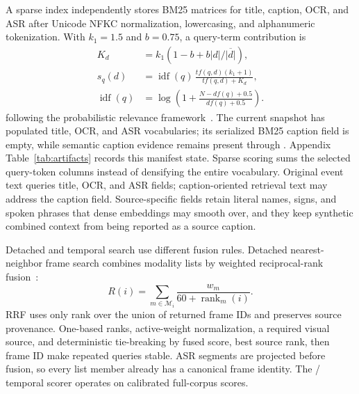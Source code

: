 A sparse index independently stores BM25 matrices for title, caption, OCR, and
ASR after Unicode NFKC normalization, lowercasing, and alphanumeric tokenization.
With $k_1=1.5$ and $b=0.75$, a query-term contribution is
\begin{equation}
 \begin{aligned}
  K_d&=k_1\!\left(1-b+b|d|/\overline{|d|}\right),\\
  s_q(d)&=\operatorname{idf}(q)\,
    \frac{tf(q,d)(k_1+1)}{tf(q,d)+K_d},\\
  \operatorname{idf}(q)&=\log\!\left(1+
    \frac{N-df(q)+0.5}{df(q)+0.5}\right).
 \end{aligned}
 \label{eq:bm25}
\end{equation}
following the probabilistic relevance framework~\cite{bm25}. The current snapshot
has populated title, OCR, and ASR vocabularies; its serialized BM25 caption field
is empty, while semantic caption evidence remains present through
\FrameContext{}. Appendix Table~\ref{tab:artifacts} records this manifest state.
Sparse scoring sums the selected query-token columns instead of densifying the
entire vocabulary. Original event text queries title, OCR, and ASR fields;
caption-oriented retrieval text may address the caption field. Source-specific
fields retain literal names, signs, and spoken phrases that dense embeddings may
smooth over, and they keep synthetic combined context from being reported as a
source caption.

Detached and temporal search use different fusion rules. Detached
nearest-neighbor frame search combines modality lists by weighted reciprocal-rank
fusion~\cite{rrf}:
\begin{equation}
 R(i)=\sum_{m\in\mathcal{M}_i}\frac{w_m}{60+\operatorname{rank}_m(i)}.
 \label{eq:rrf}
\end{equation}
RRF uses only rank over the union of returned frame IDs and preserves source
provenance. One-based ranks, active-weight normalization, a required visual
source, and deterministic tie-breaking by fused score, best source rank, then
frame ID make repeated queries stable. ASR segments are projected before fusion,
so every list member already has a canonical frame identity. The \KIS/\TRAKE{}
temporal scorer operates on calibrated full-corpus scores.

